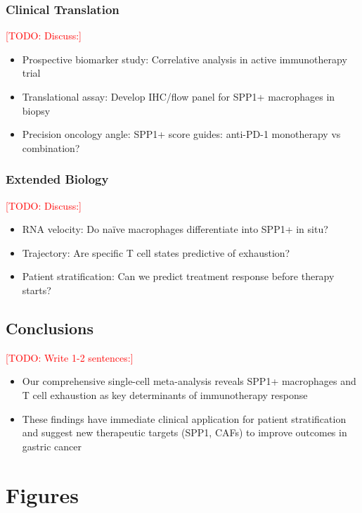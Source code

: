 \documentclass[12pt,oneside]{article}
\newcommand{\TODO}[1]{\textcolor{red}{[TODO: #1]}}
\begin{document}
\subsubsection*{Clinical Translation}
\TODO{Discuss:}
\begin{itemize}
    \item Prospective biomarker study: Correlative analysis in active immunotherapy trial
    \item Translational assay: Develop IHC/flow panel for SPP1+ macrophages in biopsy
    \item Precision oncology angle: SPP1+ score guides: anti-PD-1 monotherapy vs combination?
\end{itemize}

\subsubsection*{Extended Biology}
\TODO{Discuss:}
\begin{itemize}
    \item RNA velocity: Do naïve macrophages differentiate into SPP1+ in situ?
    \item Trajectory: Are specific T cell states predictive of exhaustion?
    \item Patient stratification: Can we predict treatment response before therapy starts?
\end{itemize}

\subsection{Conclusions}
\TODO{Write 1-2 sentences:}
\begin{itemize}
    \item Our comprehensive single-cell meta-analysis reveals SPP1+ macrophages and T cell exhaustion as key determinants of immunotherapy response
    \item These findings have immediate clinical application for patient stratification and suggest new therapeutic targets (SPP1, CAFs) to improve outcomes in gastric cancer
\end{itemize}




\appendix
\section{Figures}
\end{document}
